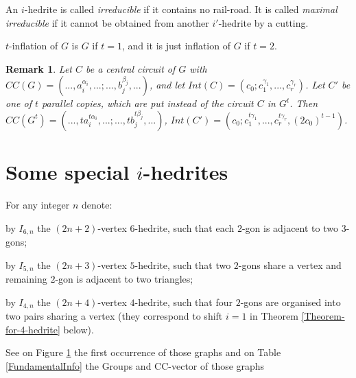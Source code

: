 \documentclass[12pt]{article}
\newtheorem{remark}{Remark}
\begin{document}

An $i$-hedrite is called {\em irreducible} if it contains no 
rail-road. It is called {\em maximal irreducible} if it cannot be
obtained from another $i'$-hedrite by a cutting.

$t$-inflation of $G$ is $G$ if $t=1$, and it is just inflation of $G$ 
if $t=2$.

\begin{remark}

Let $C$ be a central circuit of $G$ with $CC(G)=(...,a_i^{\alpha_i},...;...,b_j^{\beta_j},...)$,  and let 
$Int(C)=(c_0;c_1^{\gamma_1},...,c_r^{\gamma_r})$. Let $C'$ be one of 
$t$ parallel copies, which are put instead of the circuit $C$ in $G^t$.
Then $CC(G^t)=(...,ta_i^{t\alpha_i},...;...,tb_j^{t\beta_j},...)$,
$Int(C')=(c_0;c_1^{t\gamma_1},...,c_r^{t\gamma_r}, (2c_0)^{t-1})$.
\end{remark}


\section{Some special $i$-hedrites}
For any integer $n$ denote:

by $I_{6,n}$ the $(2n+2)$-vertex $6$-hedrite, such that each $2$-gon is adjacent to two $3$-gons;

by $I_{5,n}$ the $(2n+3)$-vertex $5$-hedrite, such that 
two $2$-gons share a vertex and remaining $2$-gon is adjacent
to two triangles;

by $I_{4,n}$ the $(2n+4)$-vertex $4$-hedrite, such that 
four $2$-gons are organised into two pairs sharing a vertex (they correspond to shift $i=1$ in Theorem \ref{Theorem-for-4-hedrite} below).


See on Figure \ref{fig:FamilyIin} the first occurrence of those graphs and on Table \ref{FundamentalInfo} the Groups and CC-vector of those graphs


\begin{figure}
\centering
\epsfxsize=100mm
\label{fig:FamilyIin}
\end{figure}
\end{document}
